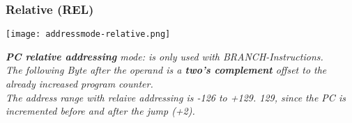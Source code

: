\subsubsection{Relative (REL)}

\texttt{[image: addressmode-relative.png]}

\textit{
    \textbf{PC relative addressing} mode: is only used with BRANCH-Instructions. \\
    The following Byte after the operand is a \textbf{two's complement} offset
    to the already increased program counter. \\
    The address range with relaive addressing is -126 to +129. 129, since
    the PC is incremented before and after the jump (+2).
}
